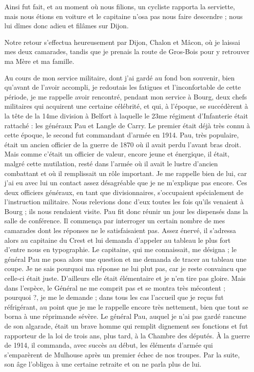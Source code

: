 \documentclass[11pt,a4paper]{report}
\begin{document}
Ainsi fut fait, et au moment où nous filions, un cycliste rapporta la serviette, mais nous étions en voiture et le capitaine n'osa pas nous faire descendre ; nous lui dîmes donc adieu et filâmes sur Dijon.

Notre retour s'effectua heureusement par Dijon, Chalon et Mâcon, où je laissai mes deux camarades, tandis que je prenais la route de Gros-Bois pour y retrouver ma Mère et ma famille.

Au cours de mon service militaire, dont j'ai gardé au fond bon souvenir, bien qu'avant de l'avoir accompli, je redoutais les fatigues et l'inconfortable de cette période, je me rappelle avoir rencontré, pendant mon service à Bourg, deux chefs militaires qui acquirent une certaine célébrité, et qui, à l'époque, se succédèrent à la tête de la 14me division à Belfort à laquelle le 23me régiment d'Infanterie était rattaché : les généraux Pau et Langle de Carry. Le premier était déjà très connu à cette époque, le second fut commandant d'armée en 1914. Pau, très populaire, était un ancien officier de la guerre de 1870 où il avait perdu l'avant bras droit. Mais comme c'était un officier de valeur, encore jeune et énergique, il était, malgré cette mutilation, resté dans l'armée où il avait le lustre d'ancien combattant et où il remplissait un rôle important. Je me rappelle bien de lui, car j'ai eu avec lui un contact assez désagréable que je ne m'explique pas encore. Ces deux officiers généraux, en tant que divisionnaires, s'occupaient spécialement de l'instruction militaire. Nous relevions donc d'eux toutes les fois qu'ils venaient à Bourg ; ils nous rendaient visite. Pau fit donc réunir un jour les dispensés dans la salle de conférence. Il commença par interroger un certain nombre de mes camarades dont les réponses ne le satisfaisaient pas. Assez énervé, il s'adressa alors au capitaine du Crest et lui demanda d'appeler au tableau le plus fort d'entre nous en typographie. Le capitaine, qui me connaissait, me désigna ; le général Pau me posa alors une question et me demanda de tracer au tableau une coupe. Je ne sais pourquoi ma réponse ne lui plut pas, car je reste convaincu que celle-ci était juste. D'ailleurs elle était élémentaire et je n'en tire pas gloire. Mais dans l'espèce, le Général ne me comprit pas et se montra très mécontent ; pourquoi ?, je me le demande ; dans tous les cas l'accueil que je reçus fut réfrigérant, au point que je me le rappelle encore très nettement, bien que tout se borna à une réprimande sévère. Le général Pau, auquel je n'ai pas gardé rancune de son algarade, était un brave homme qui remplit dignement ses fonctions et fut rapporteur de la loi de trois ans, plus tard, à la Chambre des députés. À la guerre de 1914, il commanda, avec succès au début, les éléments d'armée qui s'emparèrent de Mulhouse après un premier échec de nos troupes. Par la suite, son âge l'obligea à une certaine retraite et on ne parla plus de lui.
\end{document}
